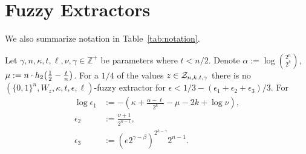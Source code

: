 

\section{Fuzzy Extractors}
\label{sec:fe}

We also summarize notation in Table~\ref{tab:notation}.

\begin{theorem}
Let $\gamma, n, \kappa, t, \ell, \nu, \gamma \in\mathbb{Z}^+$ be parameters where $t<n/2$. 
 Denote $\alpha := \log{{2^n\choose 2^k}}$, $\mu :=  n \cdot h_2\!\left(\frac{1}{2} - \frac{t}{n}\right)$.
For a $1/4$ of the values $z\in\mathcal{Z}_{n,k,t,\gamma}$ there is no $(\{0,1\}^n, W_z, \kappa, t, \epsilon, \ell)$-fuzzy extractor for 
$\epsilon<1/3 - (\epsilon_1+\epsilon_2+\epsilon_3)/3.$ 
For 
\begin{align*}\log{\epsilon_1}&:= -\left(\kappa+\frac{\alpha -\ell}{2^k} - \mu -2k+\log{\nu}\right),\\
\epsilon_2&:=\frac{\nu+1}{2^{\kappa-1}},\\
\epsilon_3&:=\left(e2^{\gamma-\beta}\right)^{2^{k-\gamma}}2^{n-1}.
\end{align*}
\label{thm:main theorem}
\end{theorem}

